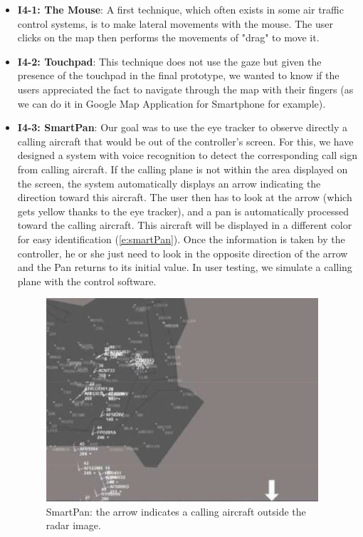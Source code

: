 \begin{itemize}

\item \textbf{I4-1: The Mouse}: A first technique, which often exists in some air traffic control systems, is to make lateral movements with the mouse. The user clicks on the map then performs the
movements of "drag" to move it.

\item \textbf{I4-2: Touchpad}: This technique does not use the gaze but given the presence of the touchpad in the final prototype, we wanted to know if the users appreciated the fact to navigate through the map
with their fingers (as we can do it in Google Map
Application for Smartphone for example).

\item \textbf{I4-3: SmartPan}: Our goal was to use the eye tracker to observe directly a calling aircraft that would be out of the controller's screen.
For this, we have designed a system with voice recognition
to detect the corresponding call sign from calling aircraft. If
the calling plane is not within the area displayed on the
screen, the system automatically displays an arrow
indicating the direction toward this aircraft. The user then
has to look at the arrow (which gets yellow thanks to the eye
tracker), and a pan is automatically processed toward the
calling aircraft. This aircraft will be displayed in a different
color for easy identification (\autoref{e:smartPan}). Once the information
is taken by the controller, he or she just need to look in the
opposite direction of the arrow and the Pan
returns to its initial value. In user testing, we simulate a
calling plane with the control software.
\begin{figure}
 \centering
	\includegraphics{Figures/smartPan.png}
	\caption{
	SmartPan: the arrow indicates a calling
aircraft outside the radar image.}
	\label{e:smartPan}
\end{figure}


\end{itemize}





